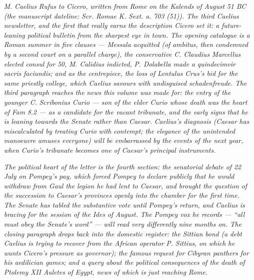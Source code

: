 
\textit{M. Caelius Rufus to Cicero, written from Rome on
the Kalends of August 51 BC (the manuscript dateline:
\textit{Scr. Romae K. Sext. a. 703 (51)}). The third
Caelius newsletter, and the first that really earns the
description Cicero set it: a future-leaning political
bulletin from the sharpest eye in town. The opening
catalogue is a Roman summer in five clauses --- Messala
acquitted (of ambitus, then condemned by a second
court on a parallel charge), the conservative C.
Claudius Marcellus elected consul for 50, M. Calidius
indicted, P. Dolabella made a quindecimvir
\textit{sacris faciundis}; and as the centrepiece,
the loss of Lentulus Crus's bid for the same priestly
college, which Caelius savours with undisguised
schadenfreude. The third paragraph reaches the news
this volume was made for: the entry of the younger C.
Scribonius Curio --- son of the elder Curio whose death
was the heart of \textit{Fam} 8.2 --- as a candidate
for the vacant tribunate, and the early signs that he
is leaning towards the Senate rather than Caesar.
Caelius's diagnosis (Caesar has miscalculated by
treating Curio with contempt; the elegance of the
unintended manoeuvre amuses everyone) will be embarrassed
by the events of the next year, when Curio's tribunate
becomes one of Caesar's principal instruments.}

\textit{The political heart of the letter is the fourth
section: the senatorial debate of 22 July on Pompey's
pay, which forced Pompey to declare publicly that he
would withdraw from Gaul the legion he had lent to
Caesar, and brought the question of the succession to
Caesar's provinces openly into the chamber for the
first time. The Senate has tabled the substantive vote
until Pompey's return, and Caelius is bracing for the
session of the Ides of August. The Pompey \textit{vox}
he records --- ``all must obey the Senate's word'' ---
will read very differently nine months on. The closing
paragraph drops back into the domestic register: the
Sittian bond (a debt Caelius is trying to recover from
the African operator P. Sittius, on which he wants
Cicero's pressure as governor); the famous request for
Cibyran panthers for his aedilician games; and a query
about the political consequences of the death of
Ptolemy XII Auletes of Egypt, news of which is just
reaching Rome.}
